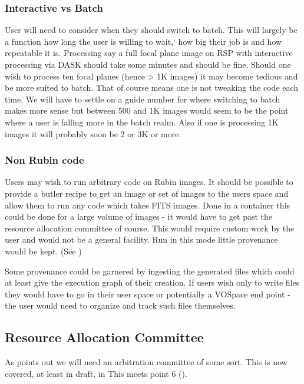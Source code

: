 \subsubsection{Interactive vs Batch} \label{sec:interactivevbatch}
User will need to consider when they should switch to batch.
This will largely be a function how long the user is willing to wait,` how big their job is and how repeatable it is.
Processing say a full focal plane image on RSP with interactive processing via DASK should take some minutes and should be fine.
Should one wish to process ten focal planes (hence > 1K images)  it may become tedious and be more suited to batch.
That of course means  one is not tweaking the code each time.
We will have to settle on a guide number for where switching to batch makes more sense but between 500 and 1K images would
seem to be the point where a user is falling more in the batch realm.
Also if one is processing 1K images it will probably soon be 2 or 3K or more.



\subsubsection{Non Rubin code} \label{sec:othercode}
Users may wish to run arbitrary code on Rubin images.
It should be possible to provide a butler recipe to get an image or set of images to the users space and allow them to run any code which takes FITS images.
Done in a container this could be done for a large volume of images - it would have to get past  the resource allocation committee of course.
This would require custom work by the user and would not be a general facility.
Run in this mode little provenance would be kept.  (See )

Some provenance could be garnered by ingesting the generated files which could at least give the execution graph of their creation.
If users wish only to write files they would have to go in their user space or potentially a VOSpace end point - the user would need to organize and track such files themselves.


\subsection{Resource Allocation Committee}\label{sec:arbitration}
As  points out we will need an arbitration committee of some sort.
This is now covered, at least in draft,  in 
This meets  point 6  ().

